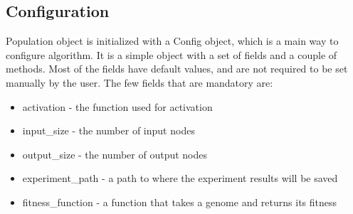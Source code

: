 \documentclass{article}
\begin{document}
        \subsection{Configuration}
        Population object is initialized with a Config object, which is a main way to configure algorithm. It is a simple object with a set of fields
        and a couple of methods. Most of the fields have default values, and are not required to be set manually by the user. The few fields that are
        mandatory are: 
        \begin{itemize}
            \item activation - the function used for activation
            \item input\_size - the number of input nodes
            \item output\_size - the number of output nodes
            \item experiment\_path - a path to where the experiment results will be saved
            \item fitness\_function - a function that takes a genome and returns its fitness
        \end{itemize}
\end{document}
